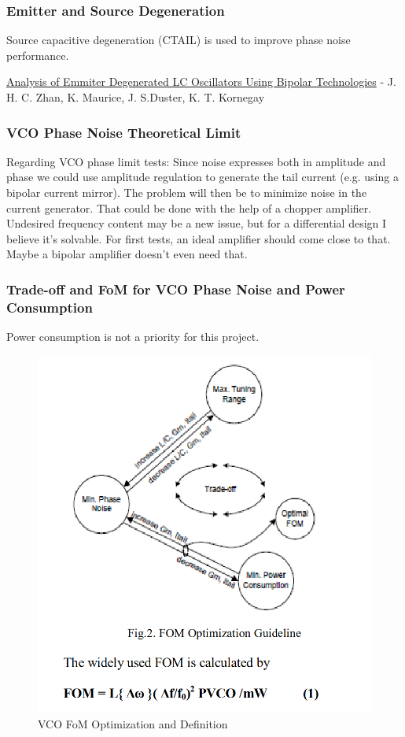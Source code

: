 \subsubsection*{Emitter and Source Degeneration}

Source capacitive degeneration (CTAIL) is used to improve phase noise performance. 

\href{https://ieeexplore.ieee.org/document/1205652?arnumber=1205652}{Analysis of Emmiter Degenerated LC Oscillators Using Bipolar Technologies} - J. H. C. Zhan, K. Maurice, J. S.Duster, K. T. Kornegay

\subsubsection*{VCO Phase Noise Theoretical Limit}

Regarding VCO phase limit tests: Since noise expresses both in amplitude and phase we could use amplitude regulation to generate the tail current (e.g. using a bipolar current mirror). The problem will then be to minimize noise in the current generator. That could be done with the help of a chopper amplifier. Undesired frequency content may be a new issue, but for a differential design I believe it's solvable. For first tests, an ideal amplifier should come close to that. Maybe a bipolar amplifier doesn't even need that.

\subsubsection*{Trade-off and FoM for VCO Phase Noise and Power Consumption}


Power consumption is not a priority for this project.

\begin{figure}[ht!]
	\centering
	\includegraphics[width=0.5\linewidth]{Figures/vco-tradeoff.png}
	\caption{VCO FoM Optimization and Definition}
	\label{fig:vco-tradeoff}
\end{figure}


